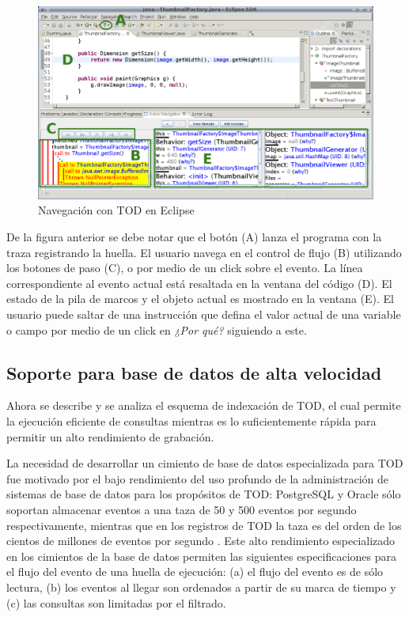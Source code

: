\documentclass[12pt,legalpaper]{report}
\begin{document}
\begin{figure}[h]
	\centering
	\includegraphics[scale=0.3]{images/TOD/ScreenShotCFlow.eps}
	\caption{Navegación con TOD en Eclipse}
	\label{screenShotCFlow}
\end{figure}

De la figura anterior se debe notar que el botón (A) lanza el programa con la traza registrando la huella.  El usuario navega en el control de flujo (B) utilizando los botones de paso (C), o por medio de un click sobre el evento.  La línea correspondiente al evento actual está resaltada en la ventana del código (D).  El estado de la pila de marcos y el objeto actual es mostrado en la ventana (E).  El usuario puede saltar de una instrucción que defina el valor actual de una variable o campo por medio de un click en \textit{¿Por qué?} siguiendo a este.


		\subsection{Soporte para base de datos de alta velocidad}

Ahora se describe y se analiza el esquema de indexación de TOD, el cual permite la ejecución eficiente de consultas mientras es lo suficientemente rápida para permitir un alto rendimiento de grabación.

La necesidad de desarrollar un cimiento de base de datos especializada para TOD fue motivado por el bajo rendimiento del uso profundo de la administración de sistemas de base de datos para los propósitos de TOD: PostgreSQL y Oracle sólo soportan almacenar eventos a una taza de 50 y 500 eventos por segundo respectivamente, mientras que en los registros de TOD la taza es del orden de los cientos de millones de eventos por segundo \cite{cots}.  Este alto rendimiento especializado en los cimientos de la base de datos permiten las siguientes especificaciones para el flujo del evento de una huella de ejecución: (a) el flujo del evento es de sólo lectura, (b) los eventos al llegar son ordenados a partir de su marca de tiempo y (c) las consultas son limitadas por el filtrado.
\end{document}
